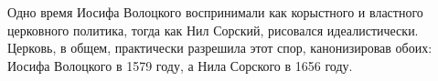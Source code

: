 \documentclass[12pt]{article}
\begin{document}
  Одно время Иосифа Волоцкого воспринимали как корыстного и властного церковного политика, тогда как Нил Сорский, рисовался идеалистически.
  Церковь, в общем, практически разрешила этот спор, канонизировав обоих: Иосифа Волоцкого в 1579 году, а Нила Сорского в 1656\footnotemark{} году.


\end{document}
